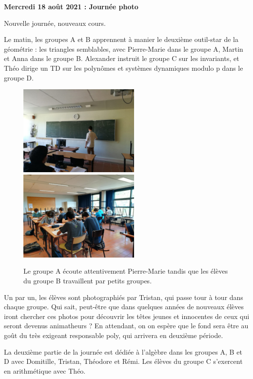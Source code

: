 \begin{center}
{\textbf{Mercredi 18 août 2021 : Journée photo}}
\end{center}
\vspace{2mm}

Nouvelle journée, nouveaux cours.

Le matin, les groupes A et B apprennent à manier le deuxième outil-star de la géométrie : les triangles semblables, avec Pierre-Marie dans le groupe A, Martin et Anna dans le groupe B. Alexander instruit le groupe C sur les invariants, et Théo dirige un TD sur les polynômes et systèmes dynamiques modulo p dans le groupe D.

\begin{figure}[H]
\centering\includegraphics[width=6cm]{CR-18-0.jpg}\hspace{2cm}\includegraphics[width=6cm]{CR-18-1.jpg}
\caption{Le groupe A écoute attentivement Pierre-Marie tandis que les élèves du groupe B travaillent par petits groupes.}
\end{figure}

Un par un, les élèves sont photographiés par Tristan, qui passe tour à tour dans chaque groupe. Qui sait, peut-être que dans quelques années de nouveaux élèves iront chercher ces photos pour découvrir les têtes jeunes et innocentes de ceux qui seront devenus animatheurs ? En attendant, on on espère que le fond sera être au goût du très exigeant responsable poly, qui arrivera en deuxième période.

La deuxième partie de la journée est dédiée à l’algèbre dans les groupes A, B et D avec Domitille, Tristan, Théodore et Rémi. Les élèves du groupe C s’exercent en arithmétique avec Théo.

